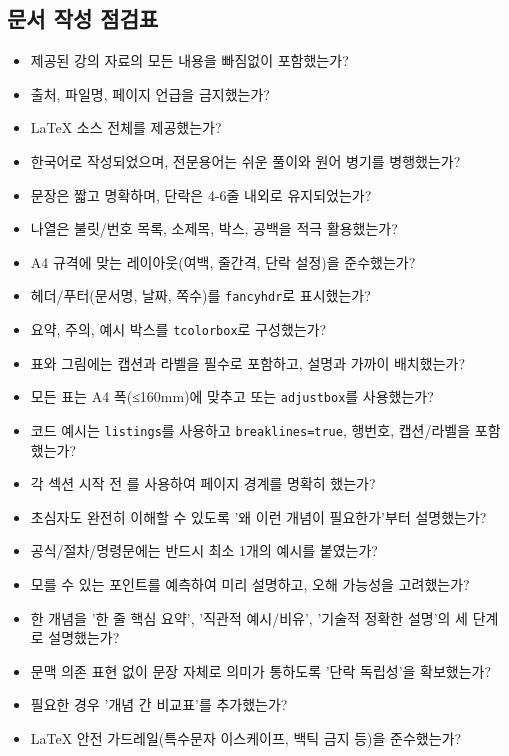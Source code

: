 \documentclass[11pt,a4paper]{article}
\theoremstyle{definition}
\begin{document}
\subsection{문서 작성 점검표}
\begin{itemize}
    \item 제공된 강의 자료의 모든 내용을 빠짐없이 포함했는가?
    \item 출처, 파일명, 페이지 언급을 금지했는가?
    \item LaTeX 소스 전체를 제공했는가?
    \item 한국어로 작성되었으며, 전문용어는 쉬운 풀이와 원어 병기를 병행했는가?
    \item 문장은 짧고 명확하며, 단락은 4-6줄 내외로 유지되었는가?
    \item 나열은 불릿/번호 목록, 소제목, 박스, 공백을 적극 활용했는가?
    \item A4 규격에 맞는 레이아웃(여백, 줄간격, 단락 설정)을 준수했는가?
    \item 헤더/푸터(문서명, 날짜, 쪽수)를 \texttt{fancyhdr}로 표시했는가?
    \item 요약, 주의, 예시 박스를 \texttt{tcolorbox}로 구성했는가?
    \item 표와 그림에는 캡션과 라벨을 필수로 포함하고, 설명과 가까이 배치했는가?
    \item 모든 표는 A4 폭(≤160mm)에 맞추고 \texttt{\resizebox} 또는 \texttt{adjustbox}를 사용했는가?
    \item 코드 예시는 \texttt{listings}를 사용하고 \texttt{breaklines=true}, 행번호, 캡션/라벨을 포함했는가?
    \item 각 섹션 시작 전 \texttt{\newpage}를 사용하여 페이지 경계를 명확히 했는가?
    \item 초심자도 완전히 이해할 수 있도록 '왜 이런 개념이 필요한가'부터 설명했는가?
    \item 공식/절차/명령문에는 반드시 최소 1개의 예시를 붙였는가?
    \item 모를 수 있는 포인트를 예측하여 미리 설명하고, 오해 가능성을 고려했는가?
    \item 한 개념을 '한 줄 핵심 요약', '직관적 예시/비유', '기술적 정확한 설명'의 세 단계로 설명했는가?
    \item 문맥 의존 표현 없이 문장 자체로 의미가 통하도록 '단락 독립성'을 확보했는가?
    \item 필요한 경우 '개념 간 비교표'를 추가했는가?
    \item LaTeX 안전 가드레일(특수문자 이스케이프, 백틱 금지 등)을 준수했는가?
\end{itemize}
\end{document}
